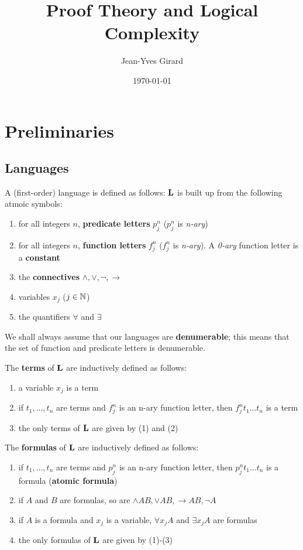 \documentclass[11pt]{article}
\author{Jean-Yves Girard}
\date{\today}
\title{Proof Theory and Logical Complexity}
\begin{document}
\maketitle
\tableofcontents \clearpage
\section{Preliminaries}
\label{sec:orge81467b}
\subsection{Languages}
\label{sec:orgf5c8609}
A (first-order) language is defined as follows: \(\operatorname{\textbf{L}}\) is built up from the
following atmoic symbols:
\begin{enumerate}
\item for all integers \(n\), \textbf{predicate letters} \(p_j^n\) (\(p_j^n\) is \emph{n-ary})
\item for all integers \(n\), \textbf{function letters} \(f_j^n\) (\(f_j^n\) is \emph{n-ary}). A \emph{0-ary}
function letter is a \textbf{constant}
\item the \textbf{connectives} \(\wedge,\vee,\neg,\to\)
\item variables \(x_j\) (\(j\in\mathbb{N}\))
\item the quantifiers \(\forall\) and \(\exists\)
\end{enumerate}


We shall always assume that our languages are \textbf{denumerable}; this means that the
set of function and predicate letters is denumerable.

The \textbf{terms} of \(\operatorname{\textbf{L}}\) are inductively defined as follows:
\begin{enumerate}
\item a variable \(x_j\) is a term
\item if \(t_1,\dots,t_n\) are terms and \(f_j^n\) is an n-ary function letter, then
\(f_j^nt_1\dots t_n\) is a term
\item the only terms of \(\operatorname{\textbf{L}}\) are given by (1) and (2)
\end{enumerate}


The \textbf{formulas} of \(\operatorname{\textbf{L}}\) are inductively defined as follows:
\begin{enumerate}
\item if \(t_1,\dots,t_n\) are terms and \(p_j^n\) is an n-ary function letter, then
\(p_j^nt_1\dots t_n\) is a formula (\textbf{atomic formula})
\item if \(A\) and \(B\) are formulas, so are \(\wedge AB,\vee AB,\to AB,\neg A\)
\item if \(A\) is a formula and \(x_j\) is a variable, \(\forall x_jA\) and \(\exists
   x_jA\) are formulas
\item the only formulas of \(\operatorname{\textbf{L}}\) are given by (1)-(3)
\end{enumerate}
\end{document}
